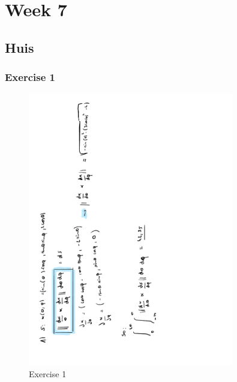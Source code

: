 \documentclass[a4paper]{report}
\begin{document}
\section{Week 7}

\subsection{Huis}

\subsubsection{Exercise 1}

\begin{figure}[H]
	\centering
	\includegraphics[angle=-90, width=0.8\textwidth]{assets/huis_7_ex_1.pdf}
	\caption{Exercise 1}
\end{figure}
\end{document}
